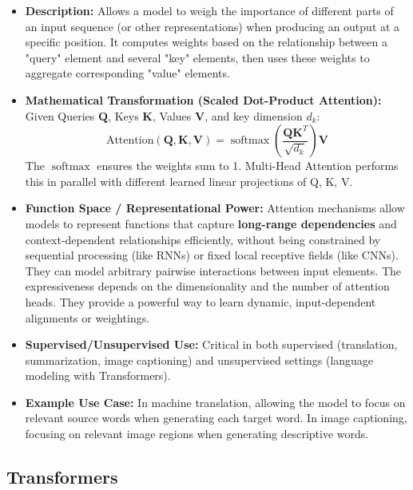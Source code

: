 \documentclass{article}
\newcommand{\bK}{\mathbf{K}}
\newcommand{\bQ}{\mathbf{Q}}
\newcommand{\bV}{\mathbf{V}}
\DeclareMathOperator{\softmax}{softmax}
\begin{document}
\begin{itemize}
    \item \textbf{Description:} Allows a model to weigh the importance of different parts of an input sequence (or other representations) when producing an output at a specific position. It computes weights based on the relationship between a "query" element and several "key" elements, then uses these weights to aggregate corresponding "value" elements.
    \item \textbf{Mathematical Transformation (Scaled Dot-Product Attention):}
        Given Queries $\bQ$, Keys $\bK$, Values $\bV$, and key dimension $d_k$:
        \begin{equation}
            \text{Attention}(\bQ, \bK, \bV) = \softmax\left(\frac{\bQ\bK^T}{\sqrt{d_k}}\right)\bV
        \end{equation}
        The $\softmax$ ensures the weights sum to 1. Multi-Head Attention performs this in parallel with different learned linear projections of Q, K, V.
    \item \textbf{Function Space / Representational Power:} Attention mechanisms allow models to represent functions that capture \textbf{long-range dependencies} and context-dependent relationships efficiently, without being constrained by sequential processing (like RNNs) or fixed local receptive fields (like CNNs). They can model arbitrary pairwise interactions between input elements. The expressiveness depends on the dimensionality and the number of attention heads. They provide a powerful way to learn dynamic, input-dependent alignments or weightings.
    \item \textbf{Supervised/Unsupervised Use:} Critical in both supervised (translation, summarization, image captioning) and unsupervised settings (language modeling with Transformers).
    \item \textbf{Example Use Case:} In machine translation, allowing the model to focus on relevant source words when generating each target word. In image captioning, focusing on relevant image regions when generating descriptive words.
\end{itemize}

\subsection{Transformers}
\end{document}
